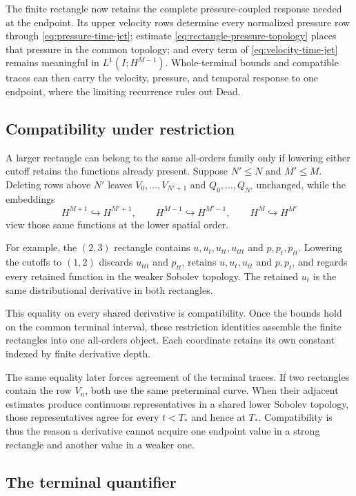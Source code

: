 The finite rectangle now retains the complete pressure-coupled response needed
at the endpoint.  Its upper velocity rows determine every normalized pressure
row through \eqref{eq:pressure-time-jet}; estimate
\eqref{eq:rectangle-pressure-topology} places that pressure in the common
topology; and every term of \eqref{eq:velocity-time-jet} remains meaningful in
\(L^1(I;H^{M-1})\).  Whole-terminal bounds and compatible traces can then carry
the velocity, pressure, and temporal response to one endpoint, where the
limiting recurrence rules out Dead.

\subsection{Compatibility under restriction}

A larger rectangle can belong to the same all-orders family only if lowering
either cutoff retains the functions already present.  Suppose \(N'\le N\)
and \(M'\le M\).  Deleting rows above \(N'\) leaves
\(V_0,\ldots,V_{N'+1}\) and \(Q_0,\ldots,Q_{N'}\) unchanged, while the
embeddings
\[
 H^{M+1}\hookrightarrow H^{M'+1},\qquad
 H^{M-1}\hookrightarrow H^{M'-1},\qquad
 H^M\hookrightarrow H^{M'}
\]
view those same functions at the lower spatial order.

For example, the \((2,3)\) rectangle contains
\(u,u_t,u_{tt},u_{ttt}\) and \(p,p_t,p_{tt}\).  Lowering the cutoffs to
\((1,2)\) discards \(u_{ttt}\) and \(p_{tt}\), retains
\(u,u_t,u_{tt}\) and \(p,p_t\), and regards every retained function in the
weaker Sobolev topology.  The retained \(u_t\) is the same distributional
derivative in both rectangles.

This equality on every shared derivative is compatibility.  Once the bounds
hold on the common terminal interval, these restriction identities assemble
the finite rectangles into one all-orders object.  Each coordinate retains
its own constant indexed by finite derivative depth.

The same equality later forces agreement of the terminal traces.  If two
rectangles contain the row \(V_n\), both use the same preterminal curve.  When
their adjacent estimates produce continuous representatives in a shared lower
Sobolev topology, those representatives agree for every \(t<T_*\) and hence at
\(T_*\).  Compatibility is thus the reason a derivative cannot acquire one
endpoint value in a strong rectangle and another value in a weaker one.

\subsection{The terminal quantifier}

